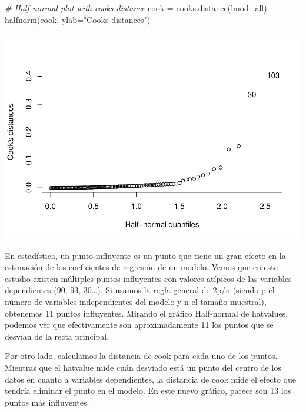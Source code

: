 \documentclass[
]{article}
\newenvironment{Shaded}{\begin{snugshade}}{\end{snugshade}}
\newcommand{\AttributeTok}[1]{\textcolor[rgb]{0.77,0.63,0.00}{#1}}
\newcommand{\CommentTok}[1]{\textcolor[rgb]{0.56,0.35,0.01}{\textit{#1}}}
\newcommand{\FunctionTok}[1]{\textcolor[rgb]{0.00,0.00,0.00}{#1}}
\newcommand{\NormalTok}[1]{#1}
\newcommand{\OtherTok}[1]{\textcolor[rgb]{0.56,0.35,0.01}{#1}}
\newcommand{\StringTok}[1]{\textcolor[rgb]{0.31,0.60,0.02}{#1}}
\begin{document}
\begin{Shaded}
\begin{Highlighting}[]
\CommentTok{\# Half normal plot with cook\textquotesingle{}s distance}
\NormalTok{cook }\OtherTok{=} \FunctionTok{cooks.distance}\NormalTok{(lmod\_all)}
\FunctionTok{halfnorm}\NormalTok{(cook, }\AttributeTok{ylab=}\StringTok{"Cook\textquotesingle{}s distances"}\NormalTok{)}
\end{Highlighting}
\end{Shaded}

\includegraphics{code_files/figure-latex/unnamed-chunk-22-2.pdf}

En estadística, un punto influyente es un punto que tiene un gran efecto
en la estimación de los coeficientes de regresión de un modelo. Vemos
que en este estudio existen múltiples puntos influyentes con valores
atípicos de las variables dependientes (90, 93, 30\ldots). Si usamos la
regla general de 2p/n (siendo p el número de variables independientes
del modelo y n el tamaño muestral), obtenemos 11 puntos influyentes.
Mirando el gráfico Half-normal de hatvalues, podemos ver que
efectivamente son aproximadamente 11 los puntos que se desvían de la
recta principal.

Por otro lado, calculamos la distancia de cook para cada uno de los
puntos. Mientras que el hatvalue mide cuán desviado está un punto del
centro de los datos en cuanto a variables dependientes, la distancia de
cook mide el efecto que tendría eliminar el punto en el modelo. En este
nuevo gráfico, parece son 13 los puntos más influyentes.
\end{document}
